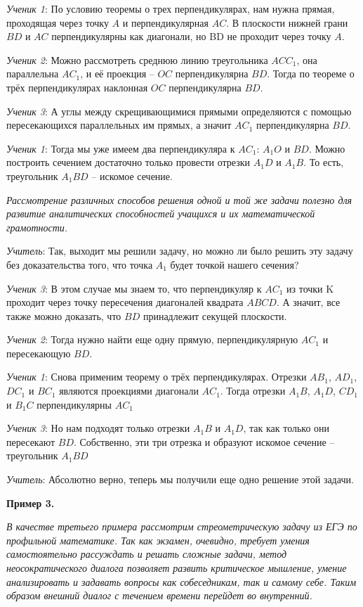 \documentclass[a4paper,14pt,russian]{extreport}
\begin{document}
\textit{Ученик 1}: По условию теоремы о трех перпендикулярах, нам нужна прямая, проходящая через точку $A$ и перпендикулярная $AC$. В плоскости нижней грани $BD$ и $AC$ перпендикулярны как диагонали, но BD не проходит через точку $A$.

\textit{Ученик 2}: Можно рассмотреть среднюю линию треугольника $ACC_1$, она параллельна $AC_1$, и её проекция – $OC$ перпендикулярна $BD$. Тогда по теореме о трёх перпендикулярах наклонная $OC$ перпендикулярна $BD$. 

\textit{Ученик 3}: А углы между скрещивающимися прямыми определяются с помощью пересекающихся параллельных им прямых, а значит $AC_1$ перпендикулярна $BD$.

\textit{Ученик 1}: Тогда мы уже имеем два перпендикуляра к $AC_1$: $A_1O$ и $BD$. Можно построить сечением достаточно только провести отрезки $A_1D$ и $A_1B$. То есть, треугольник $A_1BD$ – искомое сечение.

\textit{Рассмотрение различных способов решения одной и той же задачи полезно для развитие аналитических способностей учащихся и их математической грамотности.}

\textit{Учитель}: Так, выходит мы решили задачу, но можно ли было решить эту задачу без доказательства того, что точка $A_1$ будет точкой нашего сечения?

\textit{Ученик 3}: В этом случае мы знаем то, что перпендикуляр к $AC_1$ из точки K проходит через точку пересечения диагоналей квадрата $ABCD$. А значит, все также можно доказать, что $BD$ принадлежит секущей плоскости.

\textit{Ученик 2}: Тогда нужно найти еще одну прямую, перпендикулярную $AC_1$ и пересекающую $BD$. 

\textit{Ученик 1}: Снова применим теорему о трёх перпендикулярах. Отрезки $AB_1$, $AD_1$, $DC_1$ и $BC_1$ являются проекциями диагонали $AC_1$. Тогда отрезки $A_1B$, $A_1D$, $CD_1$ и $B_1C$ перпендикулярны $AC_1$

\textit{Ученик 3}: Но нам подходят только отрезки $A_1B$ и $A_1D$, так как только они пересекают $BD$. Собственно, эти три отрезка и образуют искомое сечение – треугольник $A_1BD$

\textit{Учитель}: Абсолютно верно, теперь мы получили еще одно решение этой задачи.

\vspace{0.4cm}

\textbf{Пример 3.}

\textit{В качестве третьего примера рассмотрим стреометрическую задачу из ЕГЭ по профильной математике. Так как экзамен, очевидно, требует умения самостоятельно рассуждать и решать сложные задачи, метод неосократического диалога позволяет развить критическое мышление, умение анализировать и задавать вопросы как собеседникам, так и самому себе. Таким образом внешний диалог с течением времени перейдет во внутренний.}
\end{document}
